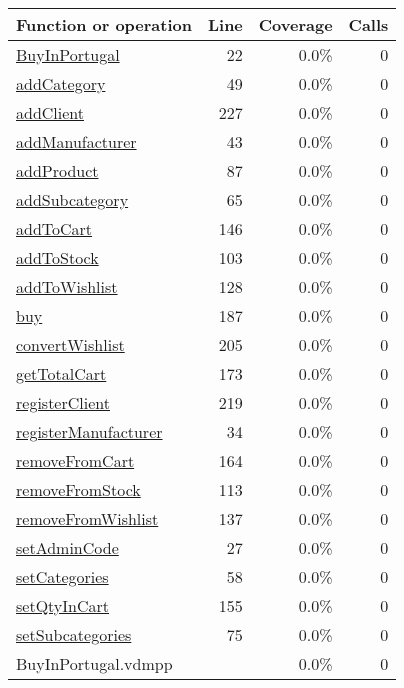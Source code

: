 \begin{longtable}{|l|r|r|r|}
\hline
Function or operation & Line & Coverage & Calls \\
\hline
\hline
\hyperref[BuyInPortugal:22]{BuyInPortugal} & 22&0.0\% & 0 \\
\hline
\hyperref[addCategory:49]{addCategory} & 49&0.0\% & 0 \\
\hline
\hyperref[addClient:227]{addClient} & 227&0.0\% & 0 \\
\hline
\hyperref[addManufacturer:43]{addManufacturer} & 43&0.0\% & 0 \\
\hline
\hyperref[addProduct:87]{addProduct} & 87&0.0\% & 0 \\
\hline
\hyperref[addSubcategory:65]{addSubcategory} & 65&0.0\% & 0 \\
\hline
\hyperref[addToCart:146]{addToCart} & 146&0.0\% & 0 \\
\hline
\hyperref[addToStock:103]{addToStock} & 103&0.0\% & 0 \\
\hline
\hyperref[addToWishlist:128]{addToWishlist} & 128&0.0\% & 0 \\
\hline
\hyperref[buy:187]{buy} & 187&0.0\% & 0 \\
\hline
\hyperref[convertWishlist:205]{convertWishlist} & 205&0.0\% & 0 \\
\hline
\hyperref[getTotalCart:173]{getTotalCart} & 173&0.0\% & 0 \\
\hline
\hyperref[registerClient:219]{registerClient} & 219&0.0\% & 0 \\
\hline
\hyperref[registerManufacturer:34]{registerManufacturer} & 34&0.0\% & 0 \\
\hline
\hyperref[removeFromCart:164]{removeFromCart} & 164&0.0\% & 0 \\
\hline
\hyperref[removeFromStock:113]{removeFromStock} & 113&0.0\% & 0 \\
\hline
\hyperref[removeFromWishlist:137]{removeFromWishlist} & 137&0.0\% & 0 \\
\hline
\hyperref[setAdminCode:27]{setAdminCode} & 27&0.0\% & 0 \\
\hline
\hyperref[setCategories:58]{setCategories} & 58&0.0\% & 0 \\
\hline
\hyperref[setQtyInCart:155]{setQtyInCart} & 155&0.0\% & 0 \\
\hline
\hyperref[setSubcategories:75]{setSubcategories} & 75&0.0\% & 0 \\
\hline
\hline
BuyInPortugal.vdmpp & & 0.0\% & 0 \\
\hline
\end{longtable}

